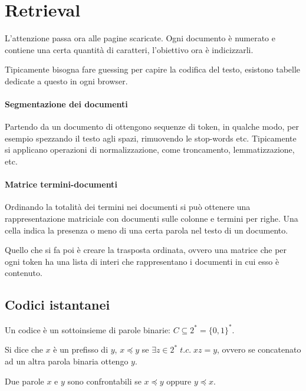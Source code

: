 \section{Retrieval}
L'attenzione passa ora alle pagine scaricate. 
Ogni documento è numerato e contiene una certa quantità di caratteri, l'obiettivo 
ora è indicizzarli.

\begin{remark}
    Tipicamente bisogna fare guessing per capire la codifica del testo, esistono 
    tabelle dedicate a questo in ogni browser.
\end{remark}

\paragraph{Segmentazione dei documenti}
Partendo da un documento di ottengono sequenze di token, in qualche modo, per esempio 
spezzando il testo agli spazi, rimuovendo le stop-words etc.
Tipicamente si applicano operazioni di normalizzazione, come troncamento, lemmatizzazione, etc.

\paragraph{Matrice termini-documenti}
Ordinando la totalità dei termini nei documenti si può ottenere una rappresentazione
matriciale con documenti sulle colonne e termini per righe. Una cella indica 
la presenza o meno di una certa parola nel testo di un documento.

Quello che si fa poi è creare la trasposta ordinata, ovvero una matrice che 
per ogni token ha una lista di interi che rappresentano i documenti in cui esso 
è contenuto.

\subsection{Codici istantanei}

Un codice è un sottoinsieme di parole binarie: $C \subseteq 2^* = \{0,1\}^*$.

\begin{definition}
    Si dice che $x$ è un prefisso di $y$, $x \preceq y$ se $\exists z \in 2^*\;t.c.\;xz = y$, ovvero se concatenato ad un altra parola binaria ottengo $y$.    
\end{definition}

\begin{definition}
    Due parole $x$ e $y$ sono confrontabili se $x \preceq y$ oppure $y \preceq x$.
\end{definition}

